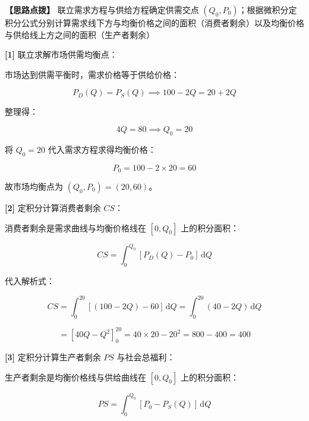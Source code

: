 \documentclass[11pt,a4paper,UTF8]{ctexart}
\begin{document}
\textbf{\color{DeepPurple}【思路点拨】} 联立需求方程与供给方程确定供需交点 $(Q_0, P_0)$；根据微积分定积分公式分别计算需求线下方与均衡价格之间的面积（消费者剩余）以及均衡价格与供给线上方之间的面积（生产者剩余）


\begin{solbox}[分步推导与答题规范]
\textbf{[1]} 联立求解市场供需均衡点：

市场达到供需平衡时，需求价格等于供给价格：


\begin{equation*}
P_D(Q) = P_S(Q) \implies 100 - 2Q = 20 + 2Q
\end{equation*}


整理得：


\begin{equation*}
4Q = 80 \implies Q_0 = 20
\end{equation*}


将 $Q_0 = 20$ 代入需求方程求得均衡价格：


\begin{equation*}
P_0 = 100 - 2 \times 20 = 60
\end{equation*}


故市场均衡点为 $(Q_0, P_0) = (20, 60)$。

\textbf{[2]} 定积分计算消费者剩余 $CS$：

消费者剩余是需求曲线与均衡价格线在 $[0, Q_0]$ 上的积分面积：


\begin{equation*}
CS = \int_0^{Q_0} [P_D(Q) - P_0]\,\mathrm{d}Q
\end{equation*}


代入解析式：


\begin{equation*}
CS = \int_0^{20} [(100 - 2Q) - 60]\,\mathrm{d}Q = \int_0^{20} (40 - 2Q)\,\mathrm{d}Q
\end{equation*}



\begin{equation*}
= \left[40Q - Q^2\right]_0^{20} = 40 \times 20 - 20^2 = 800 - 400 = 400
\end{equation*}


\textbf{[3]} 定积分计算生产者剩余 $PS$ 与社会总福利：

生产者剩余是均衡价格线与供给曲线在 $[0, Q_0]$ 上的积分面积：


\begin{equation*}
PS = \int_0^{Q_0} [P_0 - P_S(Q)]\,\mathrm{d}Q
\end{equation*}



\end{solbox}
\end{document}
